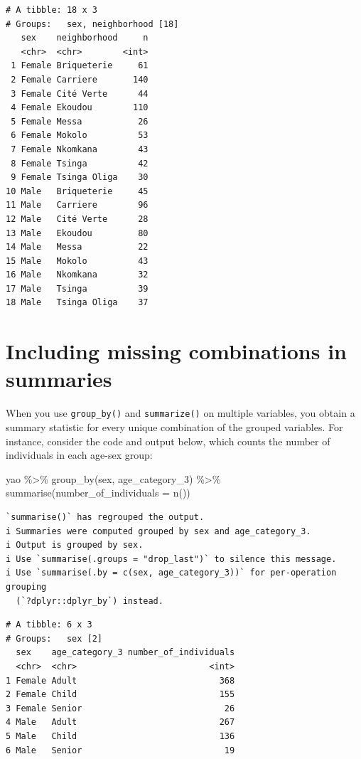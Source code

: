 \documentclass[
  letterpaper,
  DIV=11,
  numbers=noendperiod]{scrreprt}
\newenvironment{Shaded}{\begin{snugshade}}{\end{snugshade}}
\newcommand{\AttributeTok}[1]{\textcolor[rgb]{0.40,0.45,0.13}{#1}}
\newcommand{\FunctionTok}[1]{\textcolor[rgb]{0.28,0.35,0.67}{#1}}
\newcommand{\NormalTok}[1]{\textcolor[rgb]{0.00,0.23,0.31}{#1}}
\newcommand{\SpecialCharTok}[1]{\textcolor[rgb]{0.37,0.37,0.37}{#1}}
\begin{document}
\begin{verbatim}
# A tibble: 18 x 3
# Groups:   sex, neighborhood [18]
   sex    neighborhood     n
   <chr>  <chr>        <int>
 1 Female Briqueterie     61
 2 Female Carriere       140
 3 Female Cité Verte      44
 4 Female Ekoudou        110
 5 Female Messa           26
 6 Female Mokolo          53
 7 Female Nkomkana        43
 8 Female Tsinga          42
 9 Female Tsinga Oliga    30
10 Male   Briqueterie     45
11 Male   Carriere        96
12 Male   Cité Verte      28
13 Male   Ekoudou         80
14 Male   Messa           22
15 Male   Mokolo          43
16 Male   Nkomkana        32
17 Male   Tsinga          39
18 Male   Tsinga Oliga    37
\end{verbatim}

\section{Including missing combinations in
summaries}\label{including-missing-combinations-in-summaries}

When you use \texttt{group\_by()} and \texttt{summarize()} on multiple
variables, you obtain a summary statistic for every unique combination
of the grouped variables. For instance, consider the code and output
below, which counts the number of individuals in each age-sex group:

\begin{Shaded}
\begin{Highlighting}[]
\NormalTok{yao }\SpecialCharTok{\%\textgreater{}\%} 
  \FunctionTok{group\_by}\NormalTok{(sex, age\_category\_3) }\SpecialCharTok{\%\textgreater{}\%} 
  \FunctionTok{summarise}\NormalTok{(}\AttributeTok{number\_of\_individuals =} \FunctionTok{n}\NormalTok{()) }
\end{Highlighting}
\end{Shaded}

\begin{verbatim}
`summarise()` has regrouped the output.
i Summaries were computed grouped by sex and age_category_3.
i Output is grouped by sex.
i Use `summarise(.groups = "drop_last")` to silence this message.
i Use `summarise(.by = c(sex, age_category_3))` for per-operation grouping
  (`?dplyr::dplyr_by`) instead.
\end{verbatim}

\begin{verbatim}
# A tibble: 6 x 3
# Groups:   sex [2]
  sex    age_category_3 number_of_individuals
  <chr>  <chr>                          <int>
1 Female Adult                            368
2 Female Child                            155
3 Female Senior                            26
4 Male   Adult                            267
5 Male   Child                            136
6 Male   Senior                            19
\end{verbatim}
\end{document}
